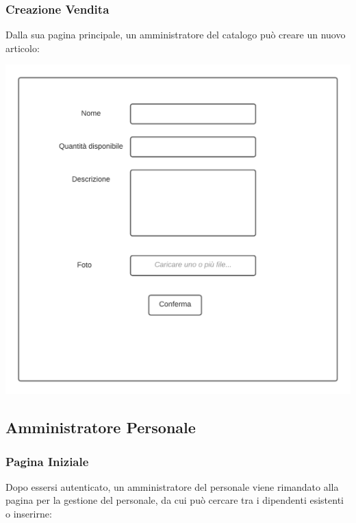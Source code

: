 \documentclass[12pt]{article}
\begin{document}
\subsubsection{Creazione Vendita}
Dalla sua pagina principale, un amministratore del catalogo può creare un nuovo articolo:

\begin{center}
\includegraphics[height=0.3\textheight]{Mockup/AmministratoreCatalogo/NuovoArticolo}
\end{center}

\newpage

\subsection{Amministratore Personale}
\subsubsection{Pagina Iniziale}
Dopo essersi autenticato, un amministratore del personale viene rimandato alla pagina per la gestione del personale, da cui può cercare tra i dipendenti esistenti o inserirne:
\end{document}
